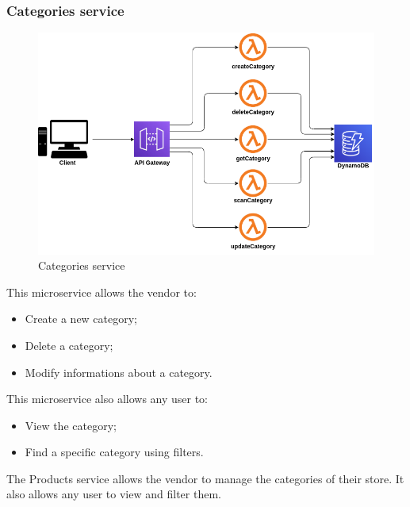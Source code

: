 \subsubsection{Categories service}
\begin{figure}[!h]
    \vspace{5px}
    \includegraphics[scale=0.5]{../../../../Images/Diagrammi/maintainerManual/categoriesService.png}
    \centering
    \caption{Categories service}
\end{figure}
This microservice allows the vendor to:
\begin{itemize}
    \item Create a new category;
    \item Delete a category;
    \item Modify informations about a category.
\end{itemize}
This microservice also allows any user to:
\begin{itemize}
    \item View the category;
    \item Find a specific category using filters.
\end{itemize}
The Products service allows the vendor to manage the categories of their store. It also allows any user to view and filter them.
\pagebreak
